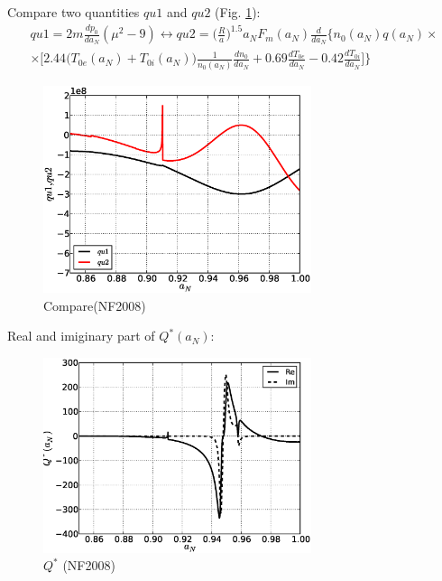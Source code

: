 \documentclass[11pt,oneside,a4paper,notitlepage]{article}
\begin{document}
Compare two quantities $qu1$ and $qu2$ (Fig. \ref{fig:compare}):
\begin{equation}\label{eq:qu1qu2}
\begin{split}
 qu1=2m\frac{dp_0}{da_N}(\mu^2-9)\longleftrightarrow qu2=\bigg(\frac{R}{a}\bigg)^{1.5}a_NF_m(a_N) \frac{d}{da_N}\Bigg\{ n_0(a_N)q(a_N)\times \\
 \times\bigg[ 2.44\bigg(T_{0e}(a_N)+T_{0i}(a_N)\bigg)\frac{1}{n_0(a_N)}\frac{dn_0}{da_N} + 0.69\frac{dT_{0e}}{da_N}-0.42\frac{dT_{0i}}{da_N} \bigg]  \Bigg\}
\end{split}
\end{equation}
 
\begin{figure}[h]
 \centering
 \includegraphics[width=0.7\textwidth]{compare.eps}
 \caption{Compare(NF2008)}
 \label{fig:compare}
\end{figure}
Real and imiginary part of $Q^*(a_N)$:

\begin{figure}[h]
 \centering
 \includegraphics[width=0.7\textwidth]{Bootstrap.eps}
 \caption{$Q^*$ (NF2008)}
 \label{fig:BootstrapQ*}
\end{figure}
\end{document}
